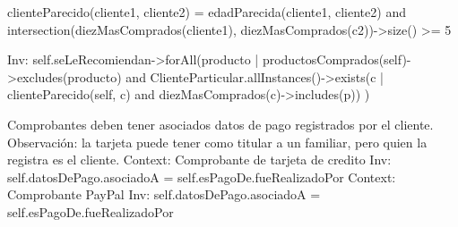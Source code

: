 \begin{listocl}
\begin{itemocl}
  clienteParecido(cliente1, cliente2) = edadParecida(cliente1, cliente2) and intersection(diezMasComprados(cliente1), diezMasComprados(c2))->size() >= 5

  Inv: self.seLeRecomiendan->forAll(producto | productosComprados(self)->excludes(producto)
      and ClienteParticular.allInstances()->exists(c | clienteParecido(self, c) and diezMasComprados(c)->includes(p))
  )
  \end{itemocl}

%
%
  \begin{itemocl}{Comprobantes deben tener asociados datos de pago registrados por el cliente.
Observación: la tarjeta puede tener como titular a un familiar, pero quien la registra es el cliente.}
    Context: Comprobante de tarjeta de credito
    Inv: self.datosDePago.asociadoA = self.esPagoDe.fueRealizadoPor
    Context: Comprobante PayPal
    Inv: self.datosDePago.asociadoA = self.esPagoDe.fueRealizadoPor
  \end{itemocl}
\end{listocl}
